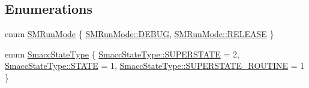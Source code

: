 \subsection*{Enumerations}
\begin{DoxyCompactItemize}
\item 
enum \hyperlink{namespacesmacc_a3e4f79486ea6ea6342dd3c712d16a4f6}{S\+M\+Run\+Mode} \{ \hyperlink{namespacesmacc_a3e4f79486ea6ea6342dd3c712d16a4f6adc30ec20708ef7b0f641ef78b7880a15}{S\+M\+Run\+Mode\+::\+D\+E\+B\+UG}, 
\hyperlink{namespacesmacc_a3e4f79486ea6ea6342dd3c712d16a4f6a7d649ef069df9885e382417c79f3d5cd}{S\+M\+Run\+Mode\+::\+R\+E\+L\+E\+A\+SE}
 \}
\item 
enum \hyperlink{namespacesmacc_a63f5f7aae7e563619d0886fca83612cc}{Smacc\+State\+Type} \{ \hyperlink{namespacesmacc_a63f5f7aae7e563619d0886fca83612cca4da54a31b31f1c863864fdee05fc35c8}{Smacc\+State\+Type\+::\+S\+U\+P\+E\+R\+S\+T\+A\+TE} = 2, 
\hyperlink{namespacesmacc_a63f5f7aae7e563619d0886fca83612cca2b848a8cc886d253d21a77c43cd50aae}{Smacc\+State\+Type\+::\+S\+T\+A\+TE} = 1, 
\hyperlink{namespacesmacc_a63f5f7aae7e563619d0886fca83612cca6d39c20504d2f2afe9c8c27351e61d20}{Smacc\+State\+Type\+::\+S\+U\+P\+E\+R\+S\+T\+A\+T\+E\+\_\+\+R\+O\+U\+T\+I\+NE} = 1
 \}
\end{DoxyCompactItemize}
